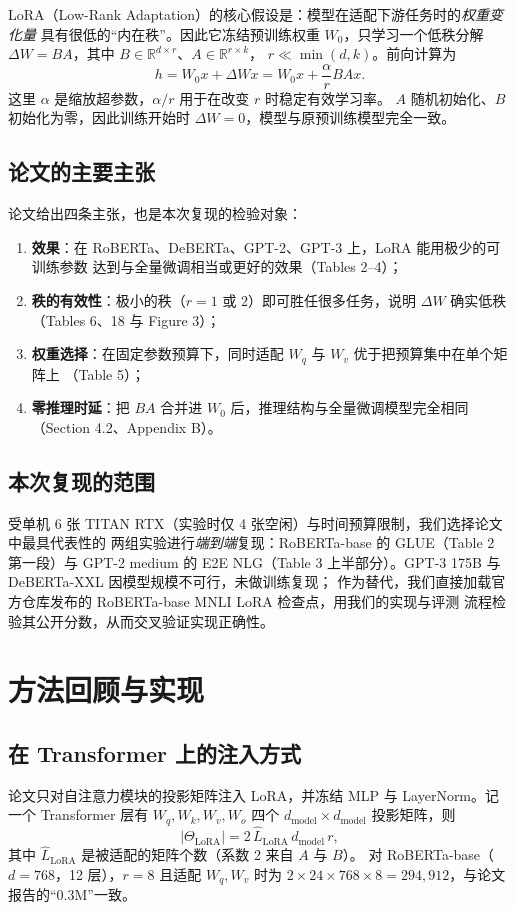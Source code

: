 \documentclass[11pt,a4paper]{ctexart}
\begin{document}
LoRA（Low-Rank Adaptation）的核心假设是：模型在适配下游任务时的\emph{权重变化量}
具有很低的“内在秩”。因此它冻结预训练权重 $W_0$，只学习一个低秩分解
$\Delta W = BA$，其中 $B\in\mathbb{R}^{d\times r}$、$A\in\mathbb{R}^{r\times k}$，
$r\ll \min(d,k)$。前向计算为
\begin{equation}
h = W_0 x + \Delta W x = W_0 x + \frac{\alpha}{r}BAx .
\label{eq:lora}
\end{equation}
这里 $\alpha$ 是缩放超参数，$\alpha/r$ 用于在改变 $r$ 时稳定有效学习率。
$A$ 随机初始化、$B$ 初始化为零，因此训练开始时 $\Delta W=0$，模型与原预训练模型完全一致。

\subsection{论文的主要主张}
论文给出四条主张，也是本次复现的检验对象：
\begin{enumerate}
  \item \textbf{效果}：在 RoBERTa、DeBERTa、GPT-2、GPT-3 上，LoRA 能用极少的可训练参数
        达到与全量微调相当或更好的效果（Tables 2--4）；
  \item \textbf{秩的有效性}：极小的秩（$r=1$ 或 $2$）即可胜任很多任务，说明 $\Delta W$ 确实低秩
        （Tables 6、18 与 Figure 3）；
  \item \textbf{权重选择}：在固定参数预算下，同时适配 $W_q$ 与 $W_v$ 优于把预算集中在单个矩阵上
        （Table 5）；
  \item \textbf{零推理时延}：把 $BA$ 合并进 $W_0$ 后，推理结构与全量微调模型完全相同
        （Section 4.2、Appendix B）。
\end{enumerate}

\subsection{本次复现的范围}
受单机 6 张 TITAN RTX（实验时仅 4 张空闲）与时间预算限制，我们选择论文中最具代表性的
两组实验进行\emph{端到端}复现：RoBERTa-base 的 GLUE（Table 2 第一段）与 GPT-2 medium 的
E2E NLG（Table 3 上半部分）。GPT-3 175B 与 DeBERTa-XXL 因模型规模不可行，未做训练复现；
作为替代，我们直接加载官方仓库发布的 RoBERTa-base MNLI LoRA 检查点，用我们的实现与评测
流程检验其公开分数，从而交叉验证实现正确性。

\section{方法回顾与实现}

\subsection{在 Transformer 上的注入方式}
论文只对自注意力模块的投影矩阵注入 LoRA，并冻结 MLP 与 LayerNorm。记一个 Transformer
层有 $W_q,W_k,W_v,W_o$ 四个 $d_{\text{model}}\times d_{\text{model}}$ 投影矩阵，则
\begin{equation}
|\Theta_{\text{LoRA}}| = 2\,\hat L_{\text{LoRA}}\, d_{\text{model}}\, r ,
\end{equation}
其中 $\hat L_{\text{LoRA}}$ 是被适配的矩阵个数（系数 2 来自 $A$ 与 $B$）。
对 RoBERTa-base（$d=768$，12 层），$r=8$ 且适配 $W_q,W_v$ 时为
$2\times 24\times 768\times 8 = 294{,}912$，与论文报告的“0.3M”一致。
\end{document}
